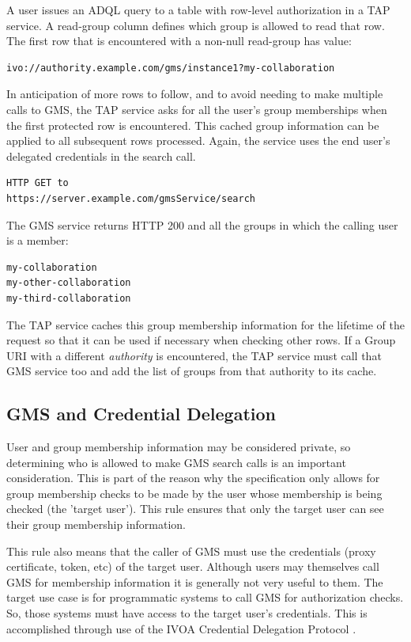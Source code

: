 \documentclass[11pt,a4paper]{ivoa}
\begin{document}
A user issues an ADQL query to a table with row-level authorization in a TAP service.  A read-group column defines which group is allowed to read that row.  The first row that is encountered with a non-null read-group has value:

\begin{verbatim}
ivo://authority.example.com/gms/instance1?my-collaboration
\end{verbatim}

In anticipation of more rows to follow, and to avoid needing to make multiple calls to GMS, the TAP service asks for all the user's group memberships when the first protected row is encountered.  This cached group information can be applied to all subsequent rows processed.  Again, the service uses the end user's delegated credentials in the search call.

\begin{verbatim}
HTTP GET to
https://server.example.com/gmsService/search
\end{verbatim}

The GMS service returns HTTP 200 and all the groups in which the calling user is a member:

\begin{verbatim}
my-collaboration
my-other-collaboration
my-third-collaboration
\end{verbatim}

The TAP service caches this group membership information for the lifetime of the request so that it can be used if necessary when checking other rows.  If a Group URI with a different \emph{authority} is encountered, the TAP service must call that GMS service too and add the list of groups from that authority to its cache.

\subsection {GMS and Credential Delegation}
\label{subsec:creddel}

User and group membership information may be considered private, so determining who is allowed to make GMS search calls is an important consideration.  This is part of the reason why the specification only allows for group membership checks to be made by the user whose membership is being checked (the 'target user').  This rule ensures that only the target user can see their group membership information.

This rule also means that the caller of GMS must use the credentials (proxy certificate, token, etc) of the target user.  Although users may themselves call GMS for membership information it is generally not very useful to them.  The target use case is for programmatic systems to call GMS for authorization checks.  So, those systems must have access to the target user's credentials.  This is accomplished through use of the IVOA Credential Delegation Protocol \citep{2010ivoa.spec.0218P}.
\end{document}
